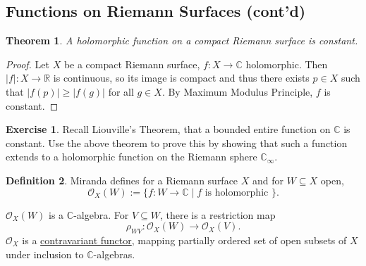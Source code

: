 \documentclass[12pt]{article}
\newcommand{\cx}{\mathbb{C}}
\newcommand{\real}{\mathbb{R}}
\newtheorem{theorem}{Theorem}[section]
\theoremstyle{definition}
\newtheorem{definition}[theorem]{Definition}
\newtheorem{exercise}{Exercise}
\theoremstyle{remark}
\begin{document}
\subsection{Functions on Riemann Surfaces (cont'd)}
\begin{theorem}
    A holomorphic function on a compact Riemann surface is constant.
\end{theorem}
\begin{proof}
    Let $X$ be a compact Riemann surface, $f:X\to\cx$ holomorphic. Then $|f|:X\to\real$ is continuous, so its image is compact and thus there exists $p\in X$ such that $|f(p)|\geq|f(g)|$ for all $g\in X$. By Maximum Modulus Principle, $f$ is constant.
\end{proof}
\begin{exercise}
    Recall Liouville's Theorem, that a bounded entire function on $\cx$ is constant. Use the above theorem to prove this by showing that such a function extends to a holomorphic function on the Riemann sphere $\cx_{\infty}$.
\end{exercise}
\begin{definition}
    Miranda defines for a Riemann surface $X$ and for $W\subseteq X$ open,
    \begin{equation}
        \mathcal{O}_X(W):=\{f:W\to\cx\mid f\text{ is holomorphic }\}.
    \end{equation}
\end{definition}
$\mathcal{O}_X(W)$ is a $\cx$-algebra. For $V\subseteq W$, there is a restriction map
\begin{equation}
    \rho_{WV}:\mathcal{O}_X(W)\to\mathcal{O}_X(V).
\end{equation}
$\mathcal{O}_X$ is a \underline{contravariant functor}, mapping partially ordered set of open subsets of $X$ under inclusion to $\cx$-algebras.
\end{document}
